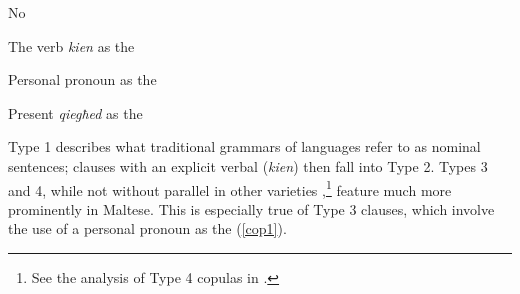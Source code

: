 \documentclass[output=paper]{langsci/langscibook}
\begin{document}
\begin{description}[font=\normalfont,noitemsep,labelwidth={\widthof{Type 4:}}]
	\item[Type 1:] No 
    \item[Type 2:] The verb \textit{kien} as the 
	\item[Type 3:] Personal pronoun as the 
	\item[Type 4:] Present  \textit{qiegħed} as the 
\end{description}
Type 1 describes what traditional grammars of  languages refer to as nominal sentences;  clauses with an explicit verbal  (\textit{kien}) then fall into Type 2. Types 3 and 4, while not without parallel in other varieties ,\footnote{See the analysis of Type 4 copulas in \cite{CamilleriSadler2019}.} feature much more prominently in Maltese. This is especially true of Type 3  clauses, which involve the use of a personal pronoun as the  (\ref{cop1}).
\end{document}
